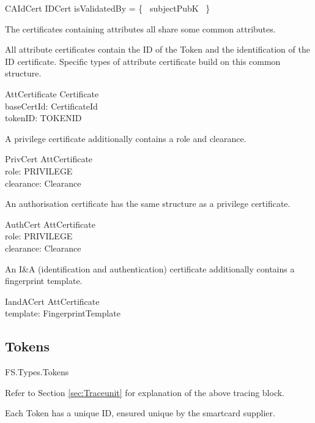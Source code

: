 \begin{schema}{CAIdCert}
        IDCert
\where
        isValidatedBy = \{~ subjectPubK ~\} 
\end{schema}


The certificates containing attributes all share some common
attributes. 

\begin{zed}[TOKENID]\end{zed} %

All attribute certificates contain the ID of 
the Token and the identification of the ID certificate. Specific types
of attribute certificate build on this common structure.
\begin{schema}{AttCertificate}
        Certificate
\\      baseCertId: CertificateId      
\\      tokenID: TOKENID 
\end{schema}


A privilege certificate additionally contains a role and clearance.
\begin{schema}{PrivCert}
	AttCertificate
\\	role: PRIVILEGE
\\	clearance: Clearance
\end{schema}


An authorisation certificate has the same structure as a privilege certificate.
\begin{schema}{AuthCert}
	AttCertificate
\\	role: PRIVILEGE
\\	clearance: Clearance
\end{schema}

An I\&A (identification and authentication) certificate additionally contains
a fingerprint template. 
\begin{schema}{IandACert}
	AttCertificate
\\	template: FingerprintTemplate
\end{schema}

\subsection{Tokens}
\label{page:firstTraceunit}
\begin{traceunit}{FS.Types.Tokens}
\end{traceunit}
\begin{Zcomment}
\item 
Refer to Section \ref{sec:Traceunit} for explanation of the
above tracing block.
\end{Zcomment}
Each Token has a unique ID, ensured unique by the smartcard supplier.
\begin{latezed}
	[ TOKENID ]
\end{latezed}

